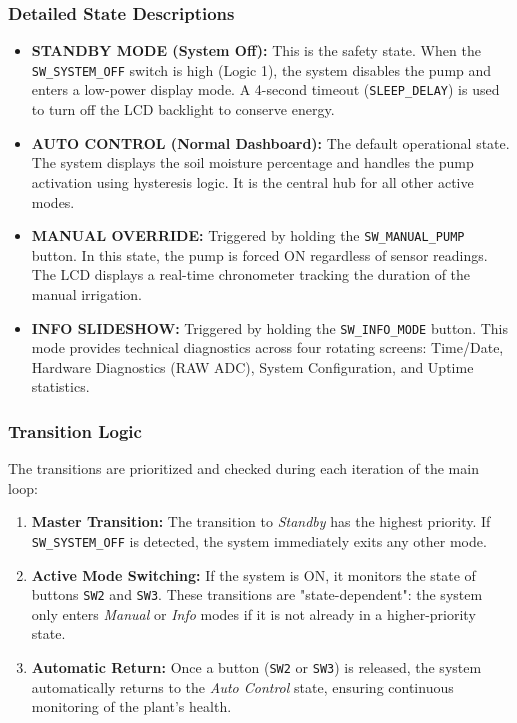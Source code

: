 \subsubsection{Detailed State Descriptions}
\begin{itemize} \sloppy
    \item \textbf{STANDBY MODE (System Off):} This is the safety state. When the \texttt{SW\allowbreak\_SYSTEM\allowbreak\_OFF} switch is high (Logic 1), the system disables the pump and enters a low-power display mode. A 4-second timeout (\texttt{SLEEP\allowbreak\_DELAY}) is used to turn off the LCD backlight to conserve energy.
    \item \textbf{AUTO CONTROL (Normal Dashboard):} The default operational state. The system displays the soil moisture percentage and handles the pump activation using hysteresis logic. It is the central hub for all other active modes.
    \item \textbf{MANUAL OVERRIDE:} Triggered by holding the \texttt{SW\allowbreak\_MANUAL\allowbreak\_PUMP} button. In this state, the pump is forced ON regardless of sensor readings. The LCD displays a real-time chronometer tracking the duration of the manual irrigation.
    \item \textbf{INFO SLIDESHOW:} Triggered by holding the \texttt{SW\allowbreak\_INFO\allowbreak\_MODE} button. This mode provides technical diagnostics across four rotating screens: Time/Date, Hardware Diagnostics (RAW ADC), System Configuration, and Uptime statistics.
\end{itemize}

\subsubsection{Transition Logic}
The transitions are prioritized and checked during each iteration of the main loop:
\begin{enumerate} \sloppy
    \item \textbf{Master Transition:} The transition to \textit{Standby} has the highest priority. If \texttt{SW\allowbreak\_SYSTEM\allowbreak\_OFF} is detected, the system immediately exits any other mode.
    \item \textbf{Active Mode Switching:} If the system is ON, it monitors the state of buttons \texttt{SW2} and \texttt{SW3}. These transitions are "state-dependent": the system only enters \textit{Manual} or \textit{Info} modes if it is not already in a higher-priority state.
    \item \textbf{Automatic Return:} Once a button (\texttt{SW2} or \texttt{SW3}) is released, the system automatically returns to the \textit{Auto Control} state, ensuring continuous monitoring of the plant's health.
\end{enumerate}

